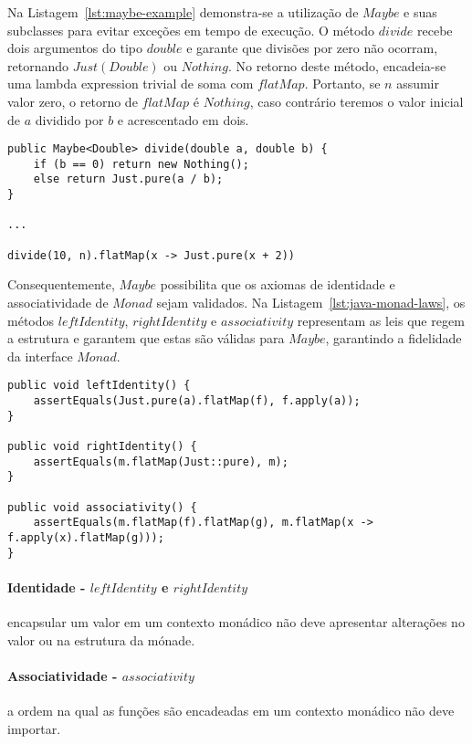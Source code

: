 \documentclass[10pt, conference]{IEEEtran}
\begin{document}
Na Listagem~\ref{lst:maybe-example} demonstra-se a utilização de $Maybe$ e suas subclasses para evitar exceções em tempo de execução. O método $divide$ recebe dois argumentos do tipo $double$ e garante que divisões por zero não ocorram, retornando $Just(Double)$ ou $Nothing$. No retorno deste método,  encadeia-se uma lambda expression trivial de soma com $flatMap$. Portanto, se $n$ assumir valor zero, o retorno de $flatMap$ é $Nothing$, caso contrário teremos o valor inicial de $a$ dividido por $b$ e acrescentado em dois.

\begin{lstlisting}[caption = {Exemplo de utilização de $Maybe$}, label = {lst:maybe-example}]
public Maybe<Double> divide(double a, double b) {
	if (b == 0) return new Nothing();
	else return Just.pure(a / b);
}

...

divide(10, n).flatMap(x -> Just.pure(x + 2))
\end{lstlisting}

Consequentemente, $Maybe$ possibilita que os axiomas de identidade e associatividade de $Monad$ sejam validados. Na Listagem~\ref{lst:java-monad-laws}, os métodos $leftIdentity$, $rightIdentity$ e $associativity$ representam as leis que regem a estrutura e garantem que estas são válidas para $Maybe$, garantindo a fidelidade da interface $Monad$.

\begin{lstlisting}[caption = {Leis de $Monad$}, label = {lst:java-monad-laws}]
public void leftIdentity() {
	assertEquals(Just.pure(a).flatMap(f), f.apply(a));
}

public void rightIdentity() {
	assertEquals(m.flatMap(Just::pure), m);
}

public void associativity() {
	assertEquals(m.flatMap(f).flatMap(g), m.flatMap(x -> f.apply(x).flatMap(g)));
}
\end{lstlisting}

\paragraph{Identidade - $leftIdentity$ e $rightIdentity$} encapsular um valor em um contexto monádico não deve apresentar alterações no valor ou na estrutura da mónade.

\paragraph{Associatividade - $associativity$} a ordem na qual as funções são encadeadas em um contexto monádico não deve importar.
\end{document}
